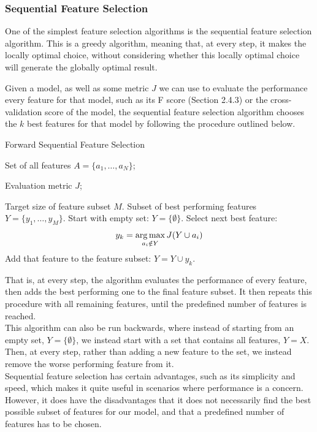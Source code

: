 \subsubsection{Sequential Feature Selection}
One of the simplest feature selection algorithms is the sequential feature selection algorithm. This is a greedy algorithm, meaning that, at every step, it makes the locally optimal choice, without considering whether this locally optimal choice will generate the globally optimal result.

Given a model, as well as some metric $J$ we can use to evaluate the performance every feature for that model, such as its F score (Section 2.4.3) or the cross-validation score of the model, the sequential feature selection algorithm chooses the $k$ best features for that model by following the procedure outlined below.

\begin{algorithm}[H]
\caption{Forward Sequential Feature Selection}
\begin{algorithmic}[1]
    \Require Set of all features $A=\{a_1, \dots, a_N\}$;
    
    Evaluation metric $J$;
    
    Target size of feature subset $M$.
    \Ensure Subset of best performing features $Y=\{y_1, \dots, y_M \}$.
    \State Start with empty set: $Y=\{\emptyset\}$.
        \State Select next best feature: \[y_k = \operatorname*{arg\,max}_{a_i\notin Y}{J(Y\cup a_i)}\]
        \State Add that feature to the feature subset: $Y=Y\cup y_k$.
    \EndFor
\end{algorithmic}
\end{algorithm}

That is, at every step, the algorithm evaluates the performance of every feature, then adds the best performing one to the final feature subset. It then repeats this procedure with all remaining features, until the predefined number of features is reached.\\

This algorithm can also be run backwards, where instead of starting from an empty set, $Y=\{\emptyset\}$, we instead start with a set that contains all features, $Y=X$. Then, at every step, rather than adding a new feature to the set, we instead remove the worse performing feature from it.\\

Sequential feature selection has certain advantages, such as its simplicity and speed, which makes it quite useful in scenarios where performance is a concern. However, it does have the disadvantages that it does not necessarily find the best possible subset of features for our model, and that a predefined number of features has to be chosen.


